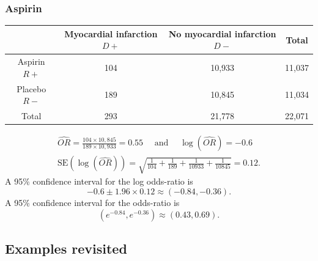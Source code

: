 \documentclass[a4paper]{article}
\begin{document}
\subsubsection{Aspirin}
\begin{table}[H]
	\centering
	\begin{tabular}{@{}cccc@{}}
	\toprule
		             & Myocardial infarction \( D+ \)  & No myocardial infarction \( D- \)  & Total \\ \midrule
	Aspirin \( R+ \) & 104	                           & 10,933                             & 11,037 \\
	Placebo \( R- \) & 189                             & 10,845                             & 11,034 \\
	Total            & 293                             & 21,778	                            & 22,071 \\ \bottomrule
	\end{tabular}
\end{table}
\begin{gather*}
	\widehat{OR} = \frac{104 \times 10,845}{189\times 10,933} = 0.55 \quad \text{ and } \quad \log(\widehat{OR}) = -0.6\\
	\text{SE}(\log(\widehat{OR})) = \sqrt{\frac{1}{104} + \frac{1}{189} + \frac{1}{10933} + \frac{1}{10845}} = 0.12.
\end{gather*}
A 95\% confidence interval for the log odds-ratio is
\[
	-0.6 \pm 1.96 \times 0.12 \approx (-0.84,-0.36).
\]
A 95\% confidence interval for the odds-ratio is
\[
	(e^{-0.84},e^{-0.36}) \approx (0.43,0.69).
\]
\subsection{Examples revisited}
\end{document}
